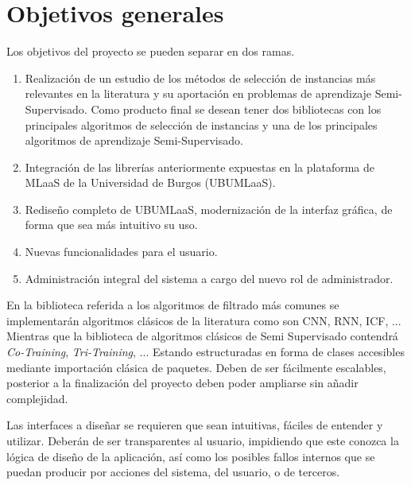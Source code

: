\newpage
\section{Objetivos generales}\label{objetivos-generales}
Los objetivos del proyecto se pueden separar en dos ramas.
\begin{enumerate}
\item Realización de un estudio de los métodos de selección de instancias más relevantes en la literatura y su aportación en problemas de aprendizaje Semi-Supervisado. Como producto final se desean tener dos bibliotecas con los principales algoritmos de selección de instancias y una de los principales algoritmos de aprendizaje Semi-Supervisado.
\item Integración de las librerías anteriormente expuestas en la plataforma de MLaaS de la Universidad de Burgos (UBUMLaaS).
\item Rediseño completo de UBUMLaaS, modernización de la interfaz gráfica, de forma que sea más intuitivo su uso.
\item Nuevas funcionalidades para el usuario.
\item Administración integral del sistema a cargo del nuevo rol de administrador.
\end{enumerate}

En la biblioteca referida a los algoritmos de filtrado más comunes se implementarán algoritmos clásicos de la literatura como son CNN, RNN, ICF, ... Mientras que la biblioteca de algoritmos clásicos de Semi Supervisado contendrá \textit{Co-Training}, \textit{Tri-Training}, ... Estando estructuradas en forma de clases accesibles mediante importación clásica de paquetes. Deben de ser fácilmente escalables, posterior a la finalización del proyecto deben poder ampliarse sin añadir complejidad.

Las interfaces a diseñar se requieren que sean intuitivas, fáciles de entender y utilizar. Deberán de ser transparentes al usuario, impidiendo que este conozca la lógica de diseño de la aplicación, así como los posibles fallos internos que se puedan producir por acciones del sistema, del usuario, o de terceros.

\newpage
